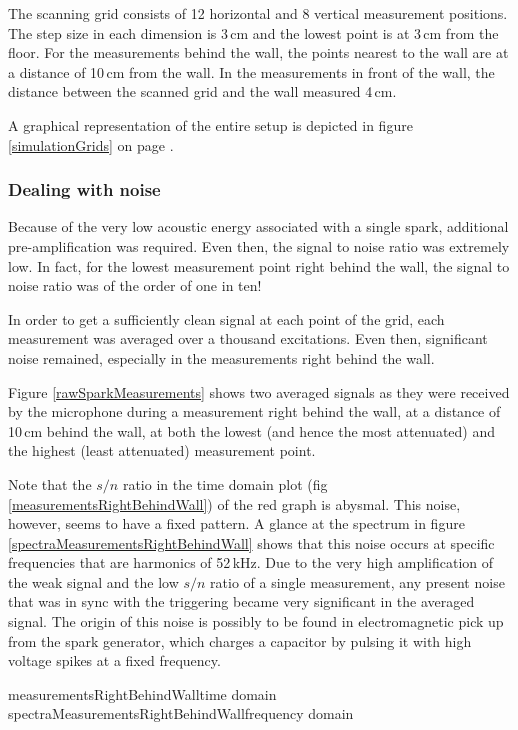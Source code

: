 The scanning grid consists of 12 horizontal and 8 vertical measurement positions. The step size in each dimension is 3\,cm and the lowest point is at 3\,cm from the floor. For the measurements behind the wall, the points nearest to the wall are at a distance of 10\,cm from the wall. In the measurements in front of the wall, the distance between the scanned grid and the wall measured 4\,cm.

A graphical representation of the entire setup is depicted in figure \ref{simulationGrids} on page \pageref{simulationGrids}.

\subsubsection*{Dealing with noise}
Because of the very low acoustic energy associated with a single spark, additional pre-amplification was required. Even then, the signal to noise ratio was extremely low. In fact, for the lowest measurement point right behind the wall, the signal to noise ratio was of the order of one in ten!

In order to get a sufficiently clean signal at each point of the grid, each measurement was averaged over a thousand excitations. Even then, significant noise remained, especially in the measurements right behind the wall.

Figure \ref{rawSparkMeasurements} shows two averaged signals as they were received by the microphone during a measurement right behind the wall, at a distance of 10\,cm behind the wall, at both the lowest (and hence the most attenuated) and the highest (least attenuated) measurement point.

Note that the $s/n$ ratio in the time domain plot (fig \ref{measurementsRightBehindWall}) of the red graph is abysmal. This noise, however, seems to have a fixed pattern. A glance at the spectrum in figure \ref{spectraMeasurementsRightBehindWall} shows that this noise occurs at specific frequencies that are harmonics of 52\,kHz. Due to the very high amplification of the weak signal and the low $s/n$ ratio of a single measurement, any present noise that was in sync with the triggering became very significant in the averaged signal. The origin of this noise is possibly to be found in electromagnetic pick up from the spark generator, which charges a capacitor by pulsing it with high voltage spikes at a fixed frequency.


	{measurementsRightBehindWall}{time domain}
	{spectraMeasurementsRightBehindWall}{frequency domain}

